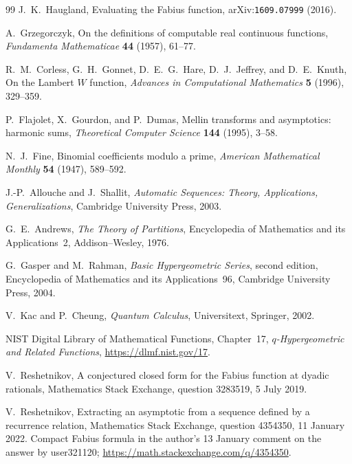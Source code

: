 \documentclass[11pt,oneside]{article}
\theoremstyle{definition}
\theoremstyle{remark}
\begin{document}
\begin{thebibliography}{99}
J.~K.~Haugland,
\newblock Evaluating the Fabius function,
\newblock arXiv:\nolinkurl{1609.07999} (2016).

A.~Grzegorczyk,
\newblock On the definitions of computable real continuous functions,
\newblock \emph{Fundamenta Mathematicae} \textbf{44} (1957), 61--77.

R.~M.~Corless, G.~H.~Gonnet, D.~E.~G.~Hare, D.~J.~Jeffrey, and D.~E.~Knuth,
\newblock On the Lambert $W$ function,
\newblock \emph{Advances in Computational Mathematics}
  \textbf{5} (1996), 329--359.

P.~Flajolet, X.~Gourdon, and P.~Dumas,
\newblock Mellin transforms and asymptotics: harmonic sums,
\newblock \emph{Theoretical Computer Science} \textbf{144} (1995), 3--58.

N.~J.~Fine,
\newblock Binomial coefficients modulo a prime,
\newblock \emph{American Mathematical Monthly} \textbf{54} (1947), 589--592.

J.-P.~Allouche and J.~Shallit,
\newblock \emph{Automatic Sequences: Theory, Applications, Generalizations},
\newblock Cambridge University Press, 2003.

G.~E.~Andrews,
\newblock \emph{The Theory of Partitions},
\newblock Encyclopedia of Mathematics and its Applications~2,
  Addison--Wesley, 1976.

G.~Gasper and M.~Rahman,
\newblock \emph{Basic Hypergeometric Series}, second edition,
\newblock Encyclopedia of Mathematics and its Applications~96,
  Cambridge University Press, 2004.

V.~Kac and P.~Cheung,
\newblock \emph{Quantum Calculus},
\newblock Universitext, Springer, 2002.

NIST Digital Library of Mathematical Functions, Chapter~17,
\newblock \emph{$q$-Hypergeometric and Related Functions},
\newblock \url{https://dlmf.nist.gov/17}.

V.~Reshetnikov,
\newblock A conjectured closed form for the Fabius function at dyadic
  rationals,
\newblock Mathematics Stack Exchange, question 3283519, 5 July 2019.

V.~Reshetnikov,
\newblock Extracting an asymptotic from a sequence defined by a recurrence relation,
\newblock Mathematics Stack Exchange, question 4354350, 11 January 2022.
\newblock Compact Fabius formula in the author's 13 January comment on the answer by
  user321120; \url{https://math.stackexchange.com/q/4354350}.


\end{thebibliography}
\end{document}
